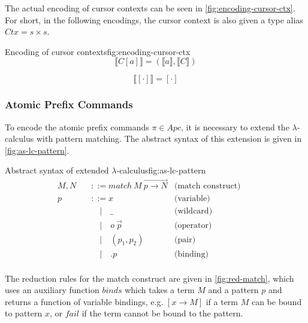 The actual encoding of cursor contexts can be seen in \cref{fig:encoding-cursor-ctx}. For short, in the following encodings, the cursor context is also given a type alias $Ctx = s \times s$.

\begin{myfigure}{Encoding of cursor contexts}{fig:encoding-cursor-ctx}
    \[
        \llbracket C[a] \rrbracket = (\llbracket a \rrbracket, \llbracket C \rrbracket)
    \]

    \[
        \llbracket [\cdot] \rrbracket = [\cdot]
    \]
\end{myfigure}

\subsubsection{Atomic Prefix Commands}
To encode the atomic prefix commands $\pi \in Apc$, it is necessary to extend the $\lambda$-calculus with pattern matching. The abstract syntax of this extension is given in \cref{fig:as-lc-pattern}.

\begin{myfigure}{Abstract syntax of extended $\lambda$-calculus}{fig:as-lc-pattern}
    \[
        \begin{aligned}
            M,N \quad & ::= match \ M \ \overrightarrow{p \rightarrow N} & \text{(match construct)} &  & \\
            p \quad   & ::= x                                            & \text{(variable)}        &  & \\
                      & \quad | \quad \_                                 & \text{(wildcard)}        &  & \\
                      & \quad | \quad o \ \Vec{p}                        & \text{(operator)}        &  & \\
                      & \quad | \quad (p_1,p_2)                          & \text{(pair)}            &  & \\
                      & \quad | \quad .p                                 & \text{(binding)}         &  & \\
        \end{aligned}
    \]
\end{myfigure}

The reduction rules for the match construct are given in \cref{fig:red-match}, which uses an auxiliary function $binds$ which takes a term $M$ and a pattern $p$ and returns a function of variable bindings, e.g. $[x \rightarrow M]$ if a term $M$ can be bound to pattern $x$, or $fail$ if the term cannot be bound to the pattern.


